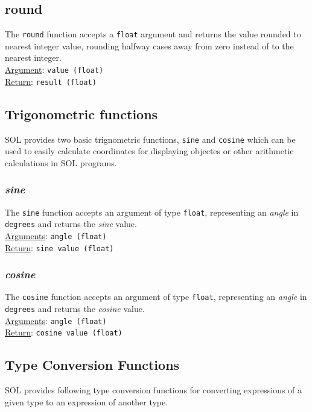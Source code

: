     \subsection{round}
    The \texttt{round} function accepts a \texttt{float} argument and returns the value rounded to nearest integer value, rounding halfway cases away from zero instead of to the nearest integer.\\
    \underline{Argument}: \texttt{value (float)}\\
    \underline{Return}: \texttt{result (float)}

    \subsection{Trigonometric functions}
    SOL provides two basic trignometric functions, \texttt{sine} and \texttt{cosine} which can be used to easily calculate coordinates for displaying objectes or other arithmetic calculations in SOL programs.

        \subsubsection{\textit{sine}}
        The \texttt{sine} function accepts an argument of type \texttt{float}, representing an \textit{angle} in \texttt{degrees} and returns
        the \textit{sine} value.\\
        \underline{Arguments}: \texttt{angle (float)}\\
        \underline{Return}: \texttt{sine value (float)}


        \subsubsection{\textit{cosine}}
        The \texttt{cosine} function accepts an argument of type \texttt{float}, representing an \textit{angle} in \texttt{degrees} and returns
        the \textit{cosine} value.\\
        \underline{Arguments}: \texttt{angle (float)}\\
        \underline{Return}: \texttt{cosine value (float)}

    \subsection{Type Conversion Functions}
    SOL provides following type conversion functions for converting expressions of a given type to an expression of another type.

